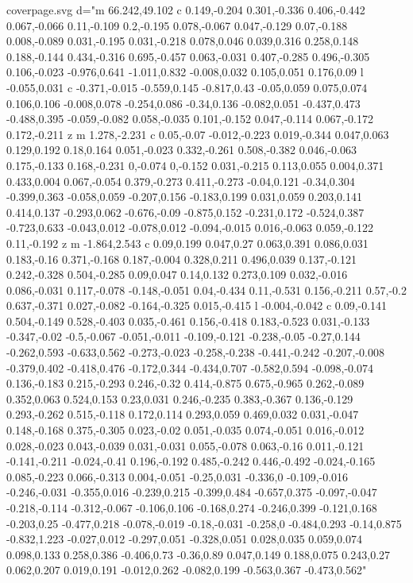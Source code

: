 \begin{filecontents}[noheader]{coverpage.svg}
					 d="m 66.242,49.102 c 0.149,-0.204 0.301,-0.336 0.406,-0.442 0.067,-0.066 0.11,-0.109 0.2,-0.195 0.078,-0.067 0.047,-0.129 0.07,-0.188 0.008,-0.089 0.031,-0.195 0.031,-0.218 0.078,0.046 0.039,0.316 0.258,0.148 0.188,-0.144 0.434,-0.316 0.695,-0.457 0.063,-0.031 0.407,-0.285 0.496,-0.305 0.106,-0.023 -0.976,0.641 -1.011,0.832 -0.008,0.032 0.105,0.051 0.176,0.09 l -0.055,0.031 c -0.371,-0.015 -0.559,0.145 -0.817,0.43 -0.05,0.059 0.075,0.074 0.106,0.106 -0.008,0.078 -0.254,0.086 -0.34,0.136 -0.082,0.051 -0.437,0.473 -0.488,0.395 -0.059,-0.082 0.058,-0.035 0.101,-0.152 0.047,-0.114 0.067,-0.172 0.172,-0.211 z m 1.278,-2.231 c 0.05,-0.07 -0.012,-0.223 0.019,-0.344 0.047,0.063 0.129,0.192 0.18,0.164 0.051,-0.023 0.332,-0.261 0.508,-0.382 0.046,-0.063 0.175,-0.133 0.168,-0.231 0,-0.074 0,-0.152 0.031,-0.215 0.113,0.055 0.004,0.371 0.433,0.004 0.067,-0.054 0.379,-0.273 0.411,-0.273 -0.04,0.121 -0.34,0.304 -0.399,0.363 -0.058,0.059 -0.207,0.156 -0.183,0.199 0.031,0.059 0.203,0.141 0.414,0.137 -0.293,0.062 -0.676,-0.09 -0.875,0.152 -0.231,0.172 -0.524,0.387 -0.723,0.633 -0.043,0.012 -0.078,0.012 -0.094,-0.015 0.016,-0.063 0.059,-0.122 0.11,-0.192 z m -1.864,2.543 c 0.09,0.199 0.047,0.27 0.063,0.391 0.086,0.031 0.183,-0.16 0.371,-0.168 0.187,-0.004 0.328,0.211 0.496,0.039 0.137,-0.121 0.242,-0.328 0.504,-0.285 0.09,0.047 0.14,0.132 0.273,0.109 0.032,-0.016 0.086,-0.031 0.117,-0.078 -0.148,-0.051 0.04,-0.434 0.11,-0.531 0.156,-0.211 0.57,-0.2 0.637,-0.371 0.027,-0.082 -0.164,-0.325 0.015,-0.415 l -0.004,-0.042 c 0.09,-0.141 0.504,-0.149 0.528,-0.403 0.035,-0.461 0.156,-0.418 0.183,-0.523 0.031,-0.133 -0.347,-0.02 -0.5,-0.067 -0.051,-0.011 -0.109,-0.121 -0.238,-0.05 -0.27,0.144 -0.262,0.593 -0.633,0.562 -0.273,-0.023 -0.258,-0.238 -0.441,-0.242 -0.207,-0.008 -0.379,0.402 -0.418,0.476 -0.172,0.344 -0.434,0.707 -0.582,0.594 -0.098,-0.074 0.136,-0.183 0.215,-0.293 0.246,-0.32 0.414,-0.875 0.675,-0.965 0.262,-0.089 0.352,0.063 0.524,0.153 0.23,0.031 0.246,-0.235 0.383,-0.367 0.136,-0.129 0.293,-0.262 0.515,-0.118 0.172,0.114 0.293,0.059 0.469,0.032 0.031,-0.047 0.148,-0.168 0.375,-0.305 0.023,-0.02 0.051,-0.035 0.074,-0.051 0.016,-0.012 0.028,-0.023 0.043,-0.039 0.031,-0.031 0.055,-0.078 0.063,-0.16 0.011,-0.121 -0.141,-0.211 -0.024,-0.41 0.196,-0.192 0.485,-0.242 0.446,-0.492 -0.024,-0.165 0.085,-0.223 0.066,-0.313 0.004,-0.051 -0.25,0.031 -0.336,0 -0.109,-0.016 -0.246,-0.031 -0.355,0.016 -0.239,0.215 -0.399,0.484 -0.657,0.375 -0.097,-0.047 -0.218,-0.114 -0.312,-0.067 -0.106,0.106 -0.168,0.274 -0.246,0.399 -0.121,0.168 -0.203,0.25 -0.477,0.218 -0.078,-0.019 -0.18,-0.031 -0.258,0 -0.484,0.293 -0.14,0.875 -0.832,1.223 -0.027,0.012 -0.297,0.051 -0.328,0.051 0.028,0.035 0.059,0.074 0.098,0.133 0.258,0.386 -0.406,0.73 -0.36,0.89 0.047,0.149 0.188,0.075 0.243,0.27 0.062,0.207 0.019,0.191 -0.012,0.262 -0.082,0.199 -0.563,0.367 -0.473,0.562"

\end{filecontents}
